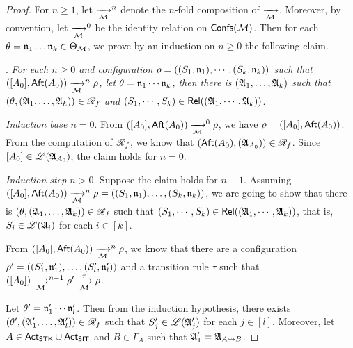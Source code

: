 \begin{proof}
For $n \ge 1$, let $\xrightarrow[{\mathcal{M} }]{}^n$ denote the $n$-fold composition of $\xrightarrow[{\mathcal{M} }]{}$. Moreover, by convention, let $\xrightarrow[{\mathcal{M} }]{}^0$ be the identity relation on ${\mathsf{Confs} }({\mathcal{M} })$. 
Then for each $\theta = \mathfrak{n}_1 \dots \mathfrak{n}_k \in \Theta_{\mathcal{M} }$, we prove by an induction on $n \ge 0$ the following claim.

\smallskip

. \emph{For each $n \ge 0$ and configuration $\rho =  ((S_1, \mathfrak{n}_1), \cdots, (S_k, \mathfrak{n}_k))$ such that 
%
$([A_0], {\sf Aft}(A_0)) \xrightarrow[{\mathcal{M} }]{}^n \rho$,  let $\theta  = \mathfrak{n}_1 \cdots \mathfrak{n}_k$, then 
%
there is  $({\mathfrak{A} }_1, \dots, {\mathfrak{A} }_k)$ such that $(\theta, ({\mathfrak{A} }_1, \dots, {\mathfrak{A} }_k)) \in \mathscr{R}_f$ and $(S_1, \cdots, S_k) \in \mathsf{Rel}(({\mathfrak{A} }_1,\cdots, {\mathfrak{A} }_k))$}.   


\smallskip

\noindent \emph{Induction base $n = 0$}. From $([A_0], {\sf Aft}(A_0)) \xrightarrow[{\mathcal{M} }]{}^0 \rho$, we have $\rho = ([A_0], {\sf Aft}(A_0))$. From the computation of $\mathscr{R}_f$, we know that $({\sf Aft}(A_0), ({\mathfrak{A} }_{A_0})) \in \mathscr{R}_f$. Since $[A_0] \in {\mathscr{L} }({\mathfrak{A} }_{A_0})$, the claim holds for $n = 0$. 

\smallskip

\noindent \emph{Induction step $n > 0$}. Suppose the claim holds for $n-1$. Assuming $([A_0], {\sf Aft}(A_0)) \xrightarrow[{\mathcal{M} }]{}^n \rho =  ((S_1, \mathfrak{n}_1), \dots, (S_k, \mathfrak{n}_k))$, we are going to show that there is  $(\theta, ({\mathfrak{A} }_1, \dots, {\mathfrak{A} }_k)) \in \mathscr{R}_f$ such that $(S_1, \cdots, S_k) \in \mathsf{Rel}(({\mathfrak{A} }_1,\cdots, {\mathfrak{A} }_k))$, that is, $S_i \in {\mathscr{L} }({\mathfrak{A} }_i)$ for each $i \in [k]$. 

From $([A_0], {\sf Aft}(A_0)) \xrightarrow[{\mathcal{M} }]{}^n \rho$,  we know that there are a configuration $\rho' = ((S'_1, \mathfrak{n}'_1), \dots, (S'_l, \mathfrak{n}'_l))$ and a transition rule $\tau$ such that $([A_0]) \xrightarrow[{\mathcal{M} }]{}^{n-1} \rho' \xrightarrow[{\mathcal{M} }]{\tau} \rho$.

Let $\theta'= \mathfrak{n}'_1 \cdots \mathfrak{n}'_l$. Then from the induction hypothesis, there exists $(\theta', ({\mathfrak{A} }'_1, \dots, {\mathfrak{A} }'_l)) \in \mathscr{R}_f$ such that $S'_j \in {\mathscr{L} }({\mathfrak{A} }'_j)$ for each $j \in [l]$. Moreover, let $A \in {\sf Act}_{\sf STK}\cup{\sf Act}_{\sf SIT}$ and $B \in \Gamma_A$ such that ${\mathfrak{A} }'_1 = {\mathfrak{A} }_{A \rightsquigarrow B}$. 


\end{proof}
